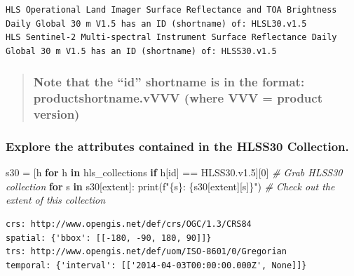 \documentclass[
  letterpaper,
]{scrartcl}
\newenvironment{Shaded}{}{}
\newcommand{\BuiltInTok}[1]{#1}
\newcommand{\CommentTok}[1]{\textcolor[rgb]{0.38,0.63,0.69}{\textit{#1}}}
\newcommand{\ControlFlowTok}[1]{\textcolor[rgb]{0.00,0.44,0.13}{\textbf{#1}}}
\newcommand{\DecValTok}[1]{\textcolor[rgb]{0.25,0.63,0.44}{#1}}
\newcommand{\KeywordTok}[1]{\textcolor[rgb]{0.00,0.44,0.13}{\textbf{#1}}}
\newcommand{\NormalTok}[1]{#1}
\newcommand{\OperatorTok}[1]{\textcolor[rgb]{0.40,0.40,0.40}{#1}}
\newcommand{\SpecialCharTok}[1]{\textcolor[rgb]{0.25,0.44,0.63}{#1}}
\newcommand{\SpecialStringTok}[1]{\textcolor[rgb]{0.73,0.40,0.53}{#1}}
\newcommand{\StringTok}[1]{\textcolor[rgb]{0.25,0.44,0.63}{#1}}
\begin{document}
\begin{verbatim}
HLS Operational Land Imager Surface Reflectance and TOA Brightness Daily Global 30 m V1.5 has an ID (shortname) of: HLSL30.v1.5
HLS Sentinel-2 Multi-spectral Instrument Surface Reflectance Daily Global 30 m V1.5 has an ID (shortname) of: HLSS30.v1.5
\end{verbatim}

\begin{quote}
\hypertarget{note-that-the-id-shortname-is-in-the-format-productshortname.vvvv-where-vvv-product-version}{%
\subsubsection{Note that the ``id'' shortname is in the format:
productshortname.vVVV (where VVV = product
version)}\label{note-that-the-id-shortname-is-in-the-format-productshortname.vvvv-where-vvv-product-version}}
\end{quote}

\hypertarget{explore-the-attributes-contained-in-the-hlss30-collection.}{%
\subsubsection{Explore the attributes contained in the HLSS30
Collection.}\label{explore-the-attributes-contained-in-the-hlss30-collection.}}

\begin{Shaded}
\begin{Highlighting}[]
\NormalTok{s30 }\OperatorTok{=}\NormalTok{ [h }\ControlFlowTok{for}\NormalTok{ h }\KeywordTok{in}\NormalTok{ hls\_collections }\ControlFlowTok{if}\NormalTok{ h[}\StringTok{\textquotesingle{}id\textquotesingle{}}\NormalTok{] }\OperatorTok{==} \StringTok{\textquotesingle{}HLSS30.v1.5\textquotesingle{}}\NormalTok{][}\DecValTok{0}\NormalTok{]  }\CommentTok{\# Grab HLSS30 collection}
\ControlFlowTok{for}\NormalTok{ s }\KeywordTok{in}\NormalTok{ s30[}\StringTok{\textquotesingle{}extent\textquotesingle{}}\NormalTok{]: }\BuiltInTok{print}\NormalTok{(}\SpecialStringTok{f"}\SpecialCharTok{\{s\}}\SpecialStringTok{: }\SpecialCharTok{\{}\NormalTok{s30[}\StringTok{\textquotesingle{}extent\textquotesingle{}}\NormalTok{][s]}\SpecialCharTok{\}}\SpecialStringTok{"}\NormalTok{)          }\CommentTok{\# Check out the extent of this collection}
\end{Highlighting}
\end{Shaded}

\begin{verbatim}
crs: http://www.opengis.net/def/crs/OGC/1.3/CRS84
spatial: {'bbox': [[-180, -90, 180, 90]]}
trs: http://www.opengis.net/def/uom/ISO-8601/0/Gregorian
temporal: {'interval': [['2014-04-03T00:00:00.000Z', None]]}
\end{verbatim}
\end{document}
